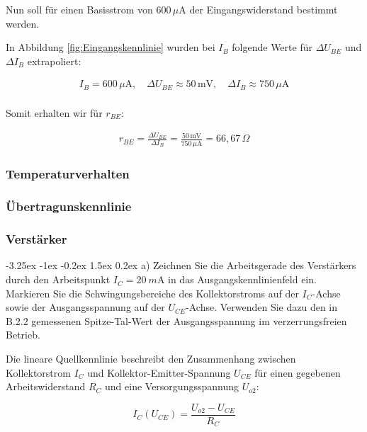 \documentclass[
	a4paper, %
	12pt, %
]{CSUniSchoolLabReport}
\makeatletter
\renewcommand\paragraph{\@startsection{paragraph}{4}{\z@}%
  {-3.25ex \@plus -1ex \@minus -0.2ex}%
  {1.5ex \@plus 0.2ex}%
  {\normalfont\normalsize\bfseries}}
\newcommand{\milli}{m}
\makeatother
\begin{document}
Nun soll für einen Basisstrom von $600\,\mu\text{A}$ der Eingangswiderstand bestimmt werden.



In Abbildung \ref{fig:Eingangskennlinie} wurden bei $I_{B}$ folgende Werte für $\Delta U_{BE}$ und $\Delta I_B$ extrapoliert:

\[
\begin{aligned}
I_B = 600\,\mu\text{A}, \quad \Delta U_{BE} \approx 50\,\text{mV}, \quad \Delta I_B \approx 750\,\mu\text{A} \\
\end{aligned}
\]

\vspace{1em}

Somit erhalten wir für $r_{BE}$:

\[
\begin{aligned}
r_{BE} = \frac{\Delta U_{BE}}{\Delta I_B} = \frac{50\,\text{mV}}{750\,\mu\text{A}} = 66{,}67\,\Omega
\end{aligned}
\]

\subsubsection{Temperaturverhalten}
\subsubsection{Übertragunskennlinie}
\subsubsection{Verstärker}


\paragraph{a) Zeichnen Sie die Arbeitsgerade des Verstärkers durch den Arbeitspunkt $I_C = \SI{20}{\milli\ampere}$ in das Ausgangskennlinienfeld ein. Markieren Sie die Schwingungsbereiche des Kollektorstroms auf der $I_C$-Achse sowie der Ausgangsspannung auf der $U_{CE}$-Achse. Verwenden Sie dazu den in B.2.2 gemessenen Spitze-Tal-Wert der Ausgangsspannung im verzerrungsfreien Betrieb.}

Die lineare Quellkennlinie beschreibt den Zusammenhang zwischen Kollektorstrom $I_C$ und Kollektor-Emitter-Spannung $U_{CE}$ für einen gegebenen Arbeitswiderstand $R_C$ und eine Versorgungsspannung $U_{o2}$:

\[
I_C(U_{CE}) = \frac{U_{o2} - U_{CE}}{R_C}
\]
\end{document}
